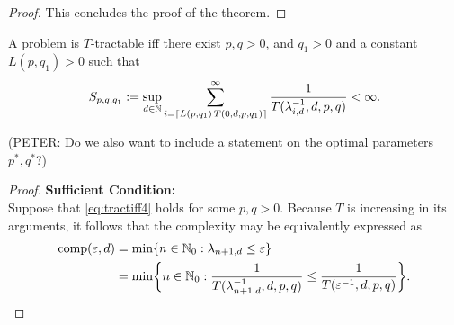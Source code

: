 \documentclass[11pt,a4paper]{article}
\newcommand{\peter}[1]{\begingroup\color{purple}#1\endgroup}
\begin{document}
{\begin{proof}
This concludes the proof of the theorem. 

\end{proof}
\bigskip

\begin{theorem}\label{thm_main_tract2} 
A problem is $T$-tractable iff there exist $p,q>0$, and $q_1>0$ and a constant $L(p,q_1) > 0$ such that
\begin{equation} \label{eq:tractiff4}
     S_{p,q,q_1}:=\sup_{d \in \mathbb{N}} 
     \sum_{i = \lceil L(p,q_1)\, T(0,d,p,q_1) \rceil}^\infty \frac{1}{T(\lambda^{-1}_{i,d},d,p,q)}< \infty.
\end{equation}
\end{theorem}

\peter{(PETER: Do we also want to include a statement on the optimal parameters $p^*,q^*$?)}

\begin{proof}
    \textbf{Sufficient Condition:}\\ Suppose that \eqref{eq:tractiff4} holds for some $p,q>0$. 
Because $T$ is increasing in its arguments, it follows that the complexity may be equivalently expressed as 
\begin{align*}
    \operatorname{comp}(\varepsilon, d) &= \min \{n \in \mathbb{N}_{0} : \lambda_{n+1, d} \le \varepsilon\} \\
    &= \min \biggl\{n \in \mathbb{N}_{0} : \frac{1}{T(\lambda_{n+1, d}^{-1},d,p,q)} \le \frac{1}{T(\varepsilon^{-1},d,p,q)} \biggr\}.
\end{align*}


\end{proof}}
\end{document}
